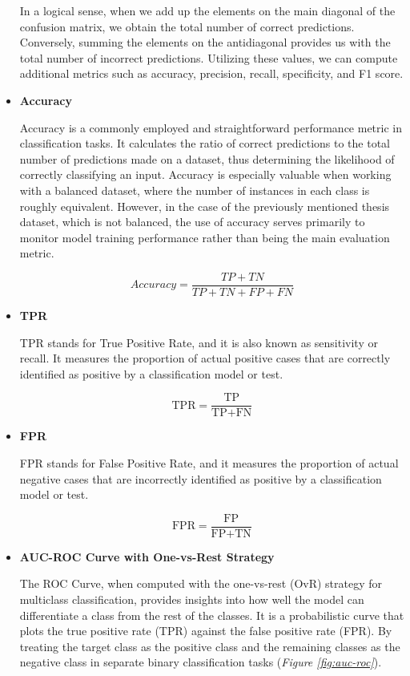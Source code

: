 \begin{itemize}
In a logical sense, when we add up the elements on the main diagonal of the confusion matrix,
we obtain the total number of correct predictions.
Conversely, summing the elements on the antidiagonal provides us with the total number of incorrect predictions.
Utilizing these values, we can compute additional metrics such as accuracy, precision, recall, specificity, and F1 score. \\

\item \textbf{Accuracy}

Accuracy is a commonly employed and straightforward performance metric in classification tasks. It calculates the ratio of correct predictions to the total number of predictions made on a dataset, thus determining the likelihood of correctly classifying an input. Accuracy is especially valuable when working with a balanced dataset, where the number of instances in each class is roughly equivalent. However, in the case of the previously mentioned thesis dataset, which is not balanced, the use of accuracy serves primarily to monitor model training performance rather than being the main evaluation metric.

\[Accuracy = \frac{TP + TN}{TP + TN + FP + FN}\]

\item \textbf{TPR}

TPR stands for True Positive Rate, and it is also known as sensitivity or recall.
It measures the proportion of actual positive cases that are correctly identified as positive
by a classification model or test.

\[
\text{TPR} = \frac{\text{TP}}{\text{TP} + \text{FN}}
\]

\item \textbf{FPR}

FPR stands for False Positive Rate, and it measures the proportion of actual negative cases that are incorrectly identified as positive by a classification model or test.

\[
\text{FPR} = \frac{\text{FP}}{\text{FP} + \text{TN}}
\]

\item \textbf{AUC-ROC Curve with One-vs-Rest Strategy}

The ROC Curve, when computed with the one-vs-rest (OvR) strategy for multiclass classification, provides insights into how well the model can differentiate a class from the rest of the classes. It is a probabilistic curve that plots the true positive rate (TPR) against the false positive rate (FPR). By treating the target class as the positive class and the remaining classes as the negative class in separate binary classification tasks (\textit{Figure \ref{fig:auc-roc}}). \\


\end{itemize}
